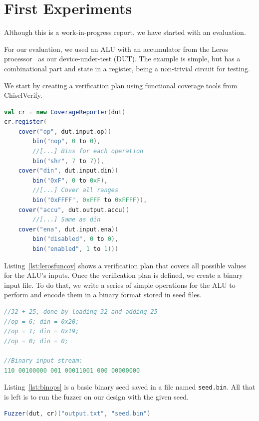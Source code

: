\documentclass[conference]{IEEEtran}
\newcommand{\martin}[1]{{\color{blue} Martin: #1}}
\begin{document}
\section{First Experiments}
\label{sec:eval}
%

Although this is a work-in-progress report, we have started with an evaluation.

For our evaluation, we used an ALU with an accumulator from the Leros processor~\cite{leros:arcs2019}
as our device-under-test (DUT).
The example is simple, but has a combinational part and state in a register, being
a non-trivial circuit for testing.

We start by creating a verification plan using functional coverage tools from ChiselVerify.
\begin{lstlisting}[captionpos=b,caption={Simple verification plan for the leros ALU. Since this is still a work-in-progress, the verification plan is simple and only contains basic cover points. The functional coverage code is also abridged since it is not our main focus in this paper.},label={lst:lerosfuncov},language=scala]
val cr = new CoverageReporter(dut)
cr.register(
    cover("op", dut.input.op)(
        bin("nop", 0 to 0),
        //[...] Bins for each operation
        bin("shr", 7 to 7)),
    cover("din", dut.input.din)(
        bin("0xF", 0 to 0xF),
        //[...] Cover all ranges
        bin("0xFFFF", 0xFFF to 0xFFFF)),
    cover("accu", dut.output.accu)(
        //[...] Same as din
    cover("ena", dut.input.ena)(
        bin("disabled", 0 to 0),
        bin("enabled", 1 to 1)))
\end{lstlisting}
Listing~\ref{lst:lerosfuncov} shows a verification plan that covers all possible values for the ALU's inputs.
Once the verification plan is defined, we create a binary input file.
To do that, we write a series of simple operations for the ALU to perform and encode them in a binary format stored in seed files.
\begin{lstlisting}[captionpos=b,caption={Basic ALU operations; dut.io.op is 3 bits wide and din is 8 bits wide. Each binary input in the example is separated with a whitespace for clarity.},label={lst:binops},language=C]
//32 + 25, done by loading 32 and adding 25 
//op = 6; din = 0x20; 
//op = 1; din = 0x19;
//op = 0; din = 0;

//Binary input stream:
110 00100000 001 00011001 000 00000000
\end{lstlisting}
Listing~\ref{lst:binops} is a basic binary seed saved in a file named \texttt{seed.bin}.
All that is left is to run the fuzzer on our design with the given seed.
\begin{lstlisting}[captionpos=b,caption={Call to the fuzzer using the setup previously described.},label={lst:fuzzcall},language=scala]
Fuzzer(dut, cr)("output.txt", "seed.bin")
\end{lstlisting}
\end{document}
